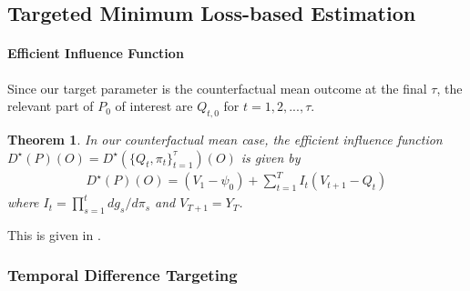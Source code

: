 \documentclass{article}
\theoremstyle{plain}
\newtheorem{theorem}{Theorem}[section]
\theoremstyle{definition}
\theoremstyle{remark}
\begin{document}
\subsection{Targeted Minimum Loss-based Estimation}



\paragraph{Efficient Influence Function} Since our target parameter is the counterfactual mean outcome at the final $\tau$, the relevant part of $P_0$ of interest are $Q_{t,0}$ for $t=1,2,...,\tau$. 

\begin{theorem}
In our counterfactual mean case, the efficient influence function $D^\star(P)(O)=D^\star(\{Q_{t},\pi_t\}_{t=1}^\tau)(O)$ is given by
\begin{align}
      D^\star(P)(O) = (V_1 - \psi_0)+\sum_{t=1}^T   I_{t}(V_{t+1} - Q_t)
\end{align}
where $I_t=\prod_{s=1}^{t}dg_s/d\pi_s$ and $V_{T+1} = Y_T$.    
\end{theorem}

This is given in \cite{laanTargetedMinimumLoss2012}.

\subsubsection{Temporal Difference Targeting}
\end{document}
